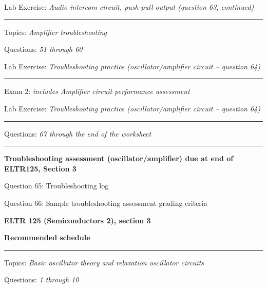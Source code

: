 \hskip 10pt Lab Exercise: {\it Audio intercom circuit, push-pull output (question 63, continued)}
 
\vskip 10pt
\hrule \vskip 5pt
\noindent
{}

\hskip 10pt Topics: {\it Amplifier troubleshooting}
 
\hskip 10pt Questions: {\it 51 through 60}
 
\hskip 10pt Lab Exercise: {\it Troubleshooting practice (oscillator/amplifier circuit -- question 64)}

\vskip 10pt
\hrule \vskip 5pt
\noindent
{}

\hskip 10pt Exam 2: {\it includes Amplifier circuit performance assessment}
 
\hskip 10pt Lab Exercise: {\it Troubleshooting practice (oscillator/amplifier circuit -- question 64)}
  
\vskip 10pt
\hrule \vskip 5pt
\noindent
{}

\hskip 10pt Questions: {\it 67 through the end of the worksheet}
 
\vskip 10pt

\hrule \vskip 5pt
\noindent
{}

\hskip 10pt {\bf Troubleshooting assessment (oscillator/amplifier) due at end of ELTR125, Section 3}

\hskip 10pt Question 65: Troubleshooting log
 
\hskip 10pt Question 66: Sample troubleshooting assessment grading criteria
 
\vskip 10pt










\vfil \eject

\centerline{\bf ELTR 125 (Semiconductors 2), section 3} \bigskip 
 
\vskip 10pt

\noindent
{\bf Recommended schedule}

\vskip 5pt

\hrule \vskip 5pt
\noindent
{}

\hskip 10pt Topics: {\it Basic oscillator theory and relaxation oscillator circuits}
 
\hskip 10pt Questions: {\it 1 through 10}
 

